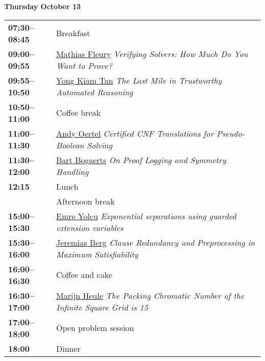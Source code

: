 \documentclass[11pt]{article}
\newcommand{\scheduletablewidth}{5.06in}
\begin{document}
\noindent\begin{minipage}{\textwidth}
\begin{center} {\bf\large Thursday October 13} \end{center}
\begin{tabular}{ p{0.9in} p{\scheduletablewidth} }

{\bf 07:30--08:45} & Breakfast  \\

{\bf 09:00--09:55} & \hyperref[FleuryInvited]{Mathias Fleury}
{\em Verifying Solvers: How Much Do You Want to Prove?} \\

{\bf 09:55--10:50} & \hyperref[Tan]{Yong Kiam Tan}
{\em The Last Mile in Trustworthy Automated Reasoning} \\

{\bf 10:50--11:00} & Coffee break \\

{\bf 11:00--11:30} & \hyperref[Oertel]{Andy Oertel}
{\em Certified CNF Translations for Pseudo-Boolean Solving} \\

{\bf 11:30--12:00} & \hyperref[Bogaerts]{Bart Bogaerts}
{\em On Proof Logging and Symmetry Handling} \\

{\bf 12:15%
} & Lunch \\

 & Afternoon break \\

{\bf 15:00--15:30} & \hyperref[Yolcu]{Emre Yolcu}
{\em Exponential separations using guarded extension variables} \\

{\bf 15:30--16:00} & \hyperref[Berg]{Jeremias Berg}
{\em Clause Redundancy and Preprocessing in Maximum Satisfiability} \\

{\bf 16:00--16:30} & Coffee and cake \\

{\bf 16:30--17:00} & \hyperref[Heule]{Marijn Heule}
{\em The Packing Chromatic Number of the Infinite Square Grid is 15} \\

{\bf 17:00--18:00} & Open problem session \\

{\bf 18:00} & Dinner \\
\end{tabular}
\end{minipage}
\end{document}
